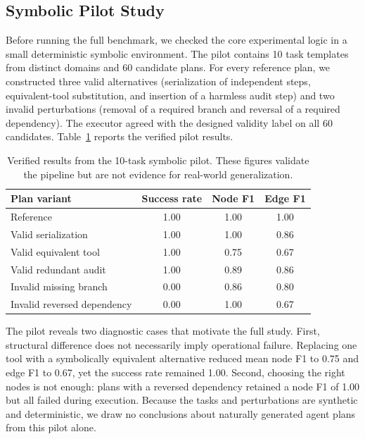 \documentclass[10pt]{article}
\begin{document}
\subsection{Symbolic Pilot Study}
Before running the full benchmark, we checked the core experimental logic in a
small deterministic symbolic environment. The pilot contains 10 task templates
from distinct domains and 60 candidate plans. For every reference plan, we
constructed three valid alternatives (serialization of independent steps,
equivalent-tool substitution, and insertion of a harmless audit step) and two
invalid perturbations (removal of a required branch and reversal of a required
dependency). The executor agreed with the designed validity label on all 60
candidates. Table~\ref{tab:pilot} reports the verified pilot results.

\begin{table}[t]
\centering
\caption{Verified results from the 10-task symbolic pilot. These figures
validate the pipeline but are not evidence for real-world generalization.}
\label{tab:pilot}
\begin{tabular}{lccc}
\toprule
Plan variant & Success rate & Node F1 & Edge F1 \\
\midrule
Reference & 1.00 & 1.00 & 1.00 \\
Valid serialization & 1.00 & 1.00 & 0.86 \\
Valid equivalent tool & 1.00 & 0.75 & 0.67 \\
Valid redundant audit & 1.00 & 0.89 & 0.86 \\
Invalid missing branch & 0.00 & 0.86 & 0.80 \\
Invalid reversed dependency & 0.00 & 1.00 & 0.67 \\
\bottomrule
\end{tabular}
\end{table}

The pilot reveals two diagnostic cases that motivate the full study. First,
structural difference does not necessarily imply operational failure. Replacing
one tool with a symbolically equivalent alternative reduced mean node F1 to
0.75 and edge F1 to 0.67, yet the success rate remained 1.00. Second, choosing
the right nodes is not enough: plans with a reversed dependency retained a node
F1 of 1.00 but all failed during execution. Because the tasks and perturbations
are synthetic and deterministic, we draw no conclusions about naturally
generated agent plans from this pilot alone.
\end{document}
